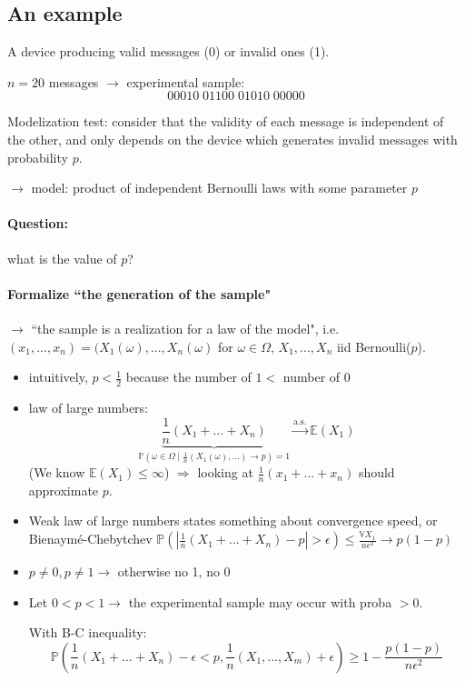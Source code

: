 \documentclass{article}
\begin{document}
\subsection{An example}
A device producing valid messages (0) or invalid ones (1).

$n=20$ messages $\to$ experimental sample:
\[00010\;01100\;01010\;00000\]

Modelization test: consider that the validity of each message is independent of the other, and only depends on the device which generates invalid messages with probability $p$.

$\to$ model: product of independent Bernoulli laws with some parameter $p$

\paragraph{Question:} what is the value of $p$?

\paragraph{Formalize ``the generation of the sample"}$\to$ ``the sample is a realization for a law of the model", i.e. $(x_1,...,x_n)=(X_1(\omega),...,X_n(\omega)$ for $\omega\in \Omega$, $X_1,...,X_n$ iid Bernoulli($p$).

\begin{itemize}
\item intuitively, $p<\frac{1}{2}$ because the number of $1<$ number of 0
\item law of large numbers: 
\[
\underbrace{\frac{1}{n}(X_1+...+X_n)}_{\mathbb{P}(\omega \in \Omega \;|\;\frac{1}{n}(X_1(\omega),...)\to p )=1} \overset{\text{a.s.}}{\to} \mathbb{E}(X_1)\] 
(We know $\mathbb{E}(X_1)\leq \infty$)
$\Rightarrow$ looking at $\frac{1}{n}(x_1+...+x_n)$ should approximate $p$.
\item Weak law of large numbers states something about convergence speed, or Bienaymé-Chebytchev $\mathbb{P}(|\frac{1}{n}(X_1+...+X_n)-p|>\epsilon)\leq \frac{\mathbb{V}X_1}{n\epsilon^2}\to p(1-p)$
\item $p\neq 0, p\neq 1 \to$ otherwise no 1, no 0
\item Let $0<p<1 \to$ the experimental sample may occur with proba $>0$. 

With B-C inequality:
\[\mathbb{P}(\frac{1}{n}(X_1+...+X_n)-\epsilon < p , \frac{1}{n}(X_1,...,X_m)+\epsilon)\geq 1-\frac{p(1-p)}{n\epsilon^2}\]
\end{itemize}
\end{document}
